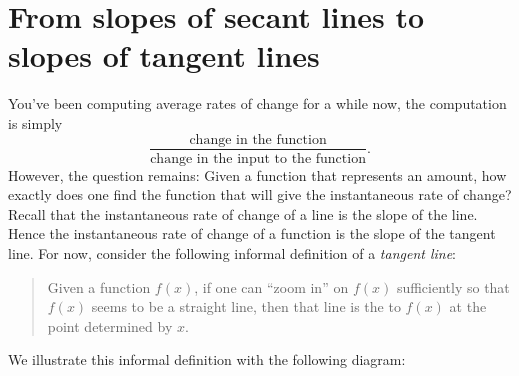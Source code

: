 \documentclass[handout]{ximera}
\begin{document}
\section{From slopes of secant lines to slopes of tangent lines}

You've been computing average rates of change for a while now, the
computation is simply
\[
\frac{\text{change in the function}}{\text{change in the input to the
    function}}.
\]
However, the question remains: Given a function that represents an
amount, how exactly does one find the function that will give the
instantaneous rate of change? Recall that the instantaneous rate of change
of a line is the slope of the line.  Hence the instantaneous rate of
change of a function is the slope of the tangent line. For now,
consider the following informal definition of a \textit{tangent line}:
\begin{quote}
Given a function $f(x)$, if one can ``zoom in''
on $f(x)$ sufficiently so that $f(x)$ seems to be a straight line,
then that line is the  to $f(x)$ at the point
determined by $x$.
\end{quote}
We illustrate this informal definition with the following diagram:
\end{document}

